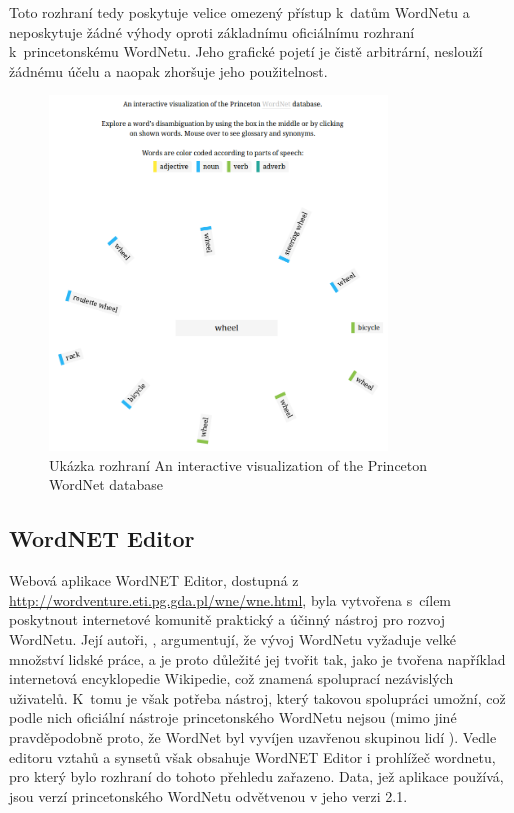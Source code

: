 \documentclass[a4paper, 11pt, oneside, showtrims]{book}
\begin{document}
					Toto rozhraní tedy poskytuje velice omezený přístup k~datům WordNetu a neposkytuje žádné výhody oproti základnímu oficiálnímu rozhraní k~princetonskému WordNetu. Jeho grafické pojetí je čistě arbitrární, neslouží žádnému účelu a naopak zhoršuje jeho použitelnost.

					\begin{figure}[h]
						\centering
						\includegraphics[width=0.8\textwidth]{intviswn.png}
						\caption{Ukázka rozhraní An interactive visualization of the Princeton WordNet database}
						\label{fig:intviswn}
					\end{figure}

				\subsection{WordNET Editor}
				\label{wnvis:wncoledit}

					Webová aplikace WordNET Editor, dostupná z \url{http://wordventure.eti.pg.gda.pl/wne/wne.html}, byla vytvořena s~cílem poskytnout internetové komunitě praktický a účinný nástroj pro rozvoj WordNetu. Její autoři, \textcite{szymanski2007cooperative}, argumentují, že vývoj WordNetu vyžaduje velké množství lidské práce, a je proto důležité jej tvořit tak, jako je tvořena například internetová encyklopedie Wikipedie, což znamená spoluprací nezávislých uživatelů. K~tomu je však potřeba nástroj, který takovou spolupráci umožní, což podle nich oficiální nástroje princetonského WordNetu nejsou (mimo jiné pravděpodobně proto, že WordNet byl vyvíjen uzavřenou skupinou lidí \parencite{fellbaum2005wordnets}). Vedle editoru vztahů a synsetů však obsahuje WordNET Editor i prohlížeč wordnetu, pro který bylo rozhraní do tohoto přehledu zařazeno. Data, jež aplikace používá, jsou verzí princetonského WordNetu odvětvenou v jeho verzi 2.1. \parencite{szymanski2007cooperative}
\end{document}
